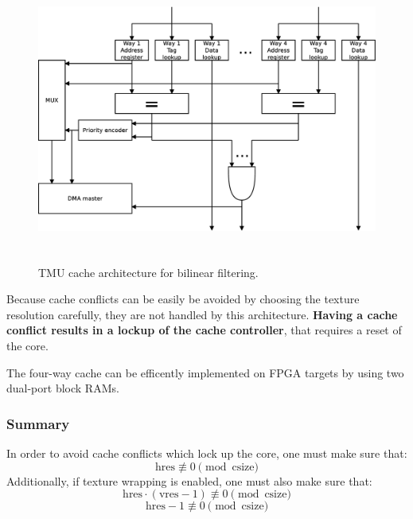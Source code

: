 \documentclass[a4paper,11pt]{article}
\begin{document}
\begin{figure}[H]
\centering
\includegraphics[height=95mm]{carch.eps}
\caption{TMU cache architecture for bilinear filtering.}\label{fig:carch}
\end{figure}

Because cache conflicts can be easily be avoided by choosing the texture resolution carefully, they are not handled by this architecture. \textbf{Having a cache conflict results in a lockup of the cache controller}, that requires a reset of the core.

The four-way cache can be efficently implemented on FPGA targets by using two dual-port block RAMs.

\subsubsection{Summary}
In order to avoid cache conflicts which lock up the core, one must make sure that:
\begin{equation*}
\text{hres} \not \equiv 0 \pmod{\text{csize}}
\end{equation*}
Additionally, if texture wrapping is enabled, one must also make sure that:
\begin{equation*}
\text{hres}\cdot(\text{vres}-1) \not \equiv 0 \pmod{\text{csize}}
\end{equation*}
\begin{equation*}
\text{hres}-1 \not \equiv 0 \pmod{\text{csize}}
\end{equation*}
\end{document}
